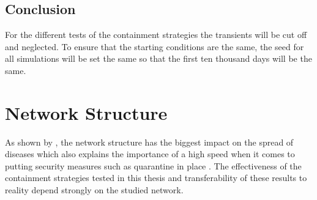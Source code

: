 \subsection{Conclusion}
For the different tests of the containment strategies the transients will be cut off and neglected. To ensure that the starting conditions are the same, the seed for all simulations will be set the same so that the first ten thousand days will be the same.
\section{Network Structure}\label{chap:networkStructQuantitative}
As shown by \citep{eames2008modelling}, the network structure has the biggest impact on the spread of diseases which also explains the importance of a high speed when it comes to putting security measures such as quarantine in place \citep{pereira2015control}. The effectiveness of the containment strategies tested in this thesis and transferability of these results to reality depend strongly on the studied network.